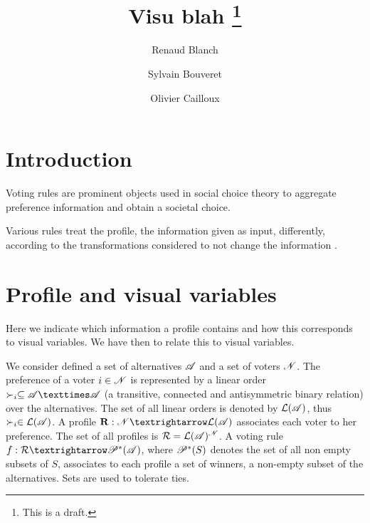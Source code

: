 \documentclass[version=last, pagesize, twoside=off, bibliography=totoc, DIV=calc, fontsize=12pt, a4paper, french, english]{scrartcl}
\begin{document}
\title{%
	\texorpdfstring{
		Visu blah%
		\thanks{
			This is a draft.
		}
	}{%
		Visu
	}
}
\author{Renaud Blanch}
\author{Sylvain Bouveret}
\author{Olivier Cailloux}
\maketitle

\section{Introduction}
\label{sec:intro}
Voting rules are prominent objects used in social choice theory to aggregate preference information and obtain a societal choice.

Various rules treat the profile, the information given as input, differently, according to the transformations considered to not change the information \citep{sen_social_1986, sen_informational_1974, sen_weights_1977, blackorby_social_1984}.

\section{Profile and visual variables}
Here we indicate which information a profile contains and how this corresponds to visual variables.
We have then to relate this to visual variables.

We consider defined a set of alternatives $\mathscr{A}$ and a set of voters $\mathscr{N}$. The preference of a voter $i \in \mathscr{N}$ is represented by a linear order $\pref_i \subseteq \allalts × \allalts$ (a transitive, connected and antisymmetric binary relation) over the alternatives. The set of all linear orders is denoted by $\mathcal{L}(\mathscr{A})$, thus $\succ_i \in \mathcal{L}(\mathscr{A})$. A profile $\prof: \allvoters → \linors$ associates each voter to her preference. The set of all profiles is $\mathcal{R} = \mathcal{L}(\mathscr{A})^{\mathscr{N}}$. A voting rule $f: \allprofs → \powersetz{\allalts}$, where $\mathscr{P}^*(S)$ denotes the set of all non empty subsets of $S$, associates to each profile a set of winners, a non-empty subset of the alternatives. Sets are used to tolerate ties.
\end{document}
